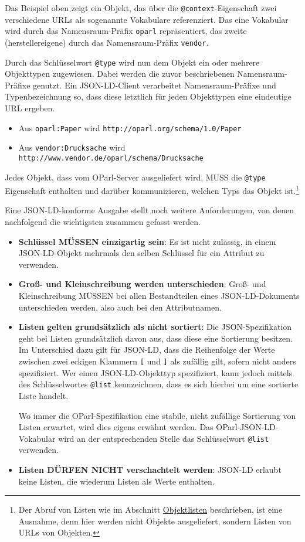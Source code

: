 \documentclass[,a4paper]{article}
\begin{document}
Das Beispiel oben zeigt ein Objekt, das über die
\texttt{@context}-Eigenschaft zwei verschiedene URLs als sogenannte
Vokabulare referenziert. Das eine Vokabular wird durch das
Namensraum-Präfix \texttt{oparl} repräsentiert, das zweite
(herstellereigene) durch das Namensraum-Präfix \texttt{vendor}.

Durch das Schlüsselwort \texttt{@type} wird nun dem Objekt ein oder
mehrere Objekttypen zugewiesen. Dabei werden die zuvor beschriebenen
Namensraum-Präfixe genutzt. Ein JSON-LD-Client verarbeitet
Namensraum-Präfixe und Typenbezeichnung so, dass diese letztlich für
jeden Objekttypen eine eindeutige URL ergeben.

\begin{itemize}
\itemsep1pt\parskip0pt
\item
  Aus \texttt{oparl:Paper} wird
  \texttt{http://oparl.org/schema/1.0/Paper}
\item
  Aus \texttt{vendor:Drucksache} wird
  \texttt{http://www.vendor.de/oparl/schema/Drucksache}
\end{itemize}

Jedes Objekt, dass vom OParl-Server ausgeliefert wird, MUSS die
\texttt{@type} Eigenschaft enthalten und darüber kommunizieren, welchen
Typs das Objekt ist.\footnote{Der Abruf von Listen wie im Abschnitt
  \hyperref[objektlisten]{Objektlisten} beschrieben, ist eine Ausnahme,
  denn hier werden nicht Objekte ausgeliefert, sondern Listen von URLs
  von Objekten.}

Eine JSON-LD-konforme Ausgabe stellt noch weitere Anforderungen, von
denen nachfolgend die wichtigsten zusammen gefasst werden.

\begin{itemize}
\item
  \textbf{Schlüssel MÜSSEN einzigartig sein}: Es ist nicht zulässig, in
  einem JSON-LD-Objekt mehrmals den selben Schlüssel für ein Attribut zu
  verwenden.
\item
  \textbf{Groß- und Kleinschreibung werden unterschieden}: Groß- und
  Kleinschreibung MÜSSEN bei allen Bestandteilen eines JSON-LD-Dokuments
  unterschieden werden, also auch bei den Attributnamen.
\item
  \textbf{Listen gelten grundsätzlich als nicht sortiert}: Die
  JSON-Spezifikation geht bei Listen grundsätzlich davon aus, dass diese
  eine Sortierung besitzen. Im Unterschied dazu gilt für JSON-LD, dass
  die Reihenfolge der Werte zwischen zwei eckigen Klammern \texttt{{[}}
  und \texttt{{]}} als zufällig gilt, sofern nicht anders spezifiziert.
  Wer einen JSON-LD-Objekttyp spezifiziert, kann jedoch mittels des
  Schlüsselwortes \texttt{@list} kennzeichnen, dass es sich hierbei um
  eine sortierte Liste handelt.

  Wo immer die OParl-Spezifikation eine stabile, nicht zufällige
  Sortierung von Listen erwartet, wird dies eigens erwähnt werden. Das
  OParl-JSON-LD-Vokabular wird an der entsprechenden Stelle das
  Schlüsselwort \texttt{@list} verwenden.
\item
  \textbf{Listen DÜRFEN NICHT verschachtelt werden}: JSON-LD erlaubt
  keine Listen, die wiederum Listen als Werte enthalten.
\end{itemize}
\end{document}
